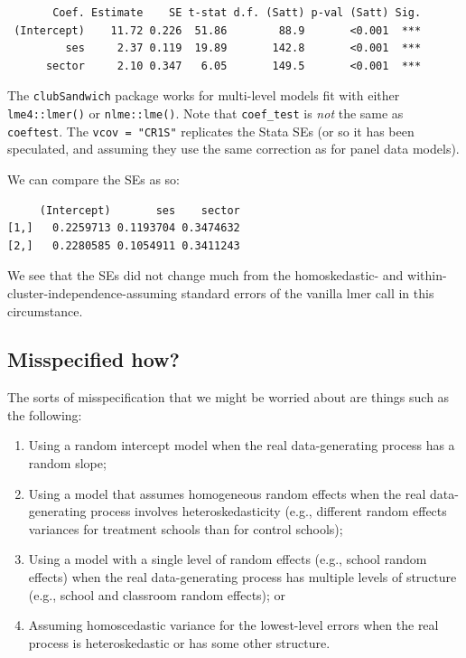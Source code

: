 \documentclass[
  letterpaper,
  DIV=11,
  numbers=noendperiod]{scrreprt}
\newenvironment{Shaded}{}{}
\newcommand{\FunctionTok}[1]{\textcolor[rgb]{0.02,0.16,0.49}{#1}}
\newcommand{\NormalTok}[1]{#1}
\newcommand{\SpecialCharTok}[1]{\textcolor[rgb]{0.25,0.44,0.63}{#1}}
\providecommand{\tightlist}{%
  \setlength{\itemsep}{0pt}\setlength{\parskip}{0pt}}\usepackage{longtable,booktabs,array}
\begin{document}
\begin{verbatim}
       Coef. Estimate    SE t-stat d.f. (Satt) p-val (Satt) Sig.
 (Intercept)    11.72 0.226  51.86        88.9       <0.001  ***
         ses     2.37 0.119  19.89       142.8       <0.001  ***
      sector     2.10 0.347   6.05       149.5       <0.001  ***
\end{verbatim}

The \texttt{clubSandwich} package works for multi-level models fit with
either \texttt{lme4::lmer()} or \texttt{nlme::lme()}. Note that
\texttt{coef\_test} is \emph{not} the same as \texttt{coeftest}. The
\texttt{vcov\ =\ "CR1S"} replicates the Stata SEs (or so it has been
speculated, and assuming they use the same correction as for panel data
models).

We can compare the SEs as so:

\begin{Shaded}
\end{Shaded}

\begin{verbatim}
     (Intercept)       ses    sector
[1,]   0.2259713 0.1193704 0.3474632
[2,]   0.2280585 0.1054911 0.3411243
\end{verbatim}

We see that the SEs did not change much from the homoskedastic- and
within-cluster-independence-assuming standard errors of the vanilla lmer
call in this circumstance.

\subsection{Misspecified how?}\label{misspecified-how}

The sorts of misspecification that we might be worried about are things
such as the following:

\begin{enumerate}
\def\labelenumi{\arabic{enumi}.}
\tightlist
\item
  Using a random intercept model when the real data-generating process
  has a random slope;
\item
  Using a model that assumes homogeneous random effects when the real
  data-generating process involves heteroskedasticity (e.g., different
  random effects variances for treatment schools than for control
  schools);
\item
  Using a model with a single level of random effects (e.g., school
  random effects) when the real data-generating process has multiple
  levels of structure (e.g., school and classroom random effects); or
\item
  Assuming homoscedastic variance for the lowest-level errors when the
  real process is heteroskedastic or has some other structure.
\end{enumerate}
\end{document}

